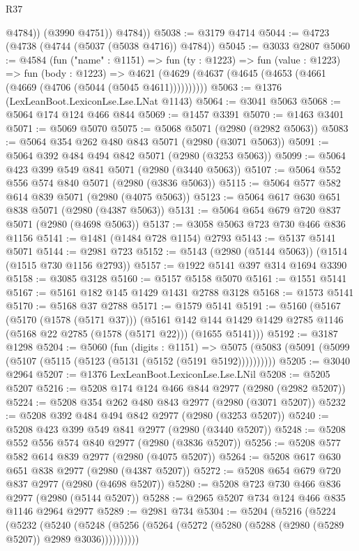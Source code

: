\begin{lexlean}{R37}
\begin{coremodule}
              @4784))
          (@3990 @4751))
        @4784))
@5038 := @3179 @4714
@5044 := @4723 (@4738 (@4744 (@5037 (@5038 @4716)) @4784))
@5045 := @3033 @2807
@5060 := @4584
    (fun ("name" : @1151) =>
    fun (ty : @1223) =>
    fun (value : @1223) =>
    fun (body : @1223) =>
    @4621 (@4629 (@4637 (@4645 (@4653 (@4661 (@4669 (@4706 (@5044 (@5045 @4611))))))))))
@5063 := @1376 (LexLeanBoot.LexiconLse.Lse.LNat @1143)
@5064 := @3041 @5063
@5068 := @5064 @174 @124 @466 @844
@5069 := @1457 @3391
@5070 := @1463 @3401
@5071 := @5069 @5070
@5075 := @5068 @5071 (@2980 (@2982 @5063))
@5083 := @5064 @354 @262 @480 @843 @5071 (@2980 (@3071 @5063))
@5091 := @5064 @392 @484 @494 @842 @5071 (@2980 (@3253 @5063))
@5099 := @5064 @423 @399 @549 @841 @5071 (@2980 (@3440 @5063))
@5107 := @5064 @552 @556 @574 @840 @5071 (@2980 (@3836 @5063))
@5115 := @5064 @577 @582 @614 @839 @5071 (@2980 (@4075 @5063))
@5123 := @5064 @617 @630 @651 @838 @5071 (@2980 (@4387 @5063))
@5131 := @5064 @654 @679 @720 @837 @5071 (@2980 (@4698 @5063))
@5137 := @3058 @5063 @723 @730 @466 @836 @1156
@5141 := @1481 (@1484 @728 @1154) @2793
@5143 := @5137 @5141 @5071
@5144 := @2981 @723
@5152 := @5143 (@2980 (@5144 @5063)) (@1514 (@1515 @730 @1156 @2793))
@5157 := @1922 @5141 @397 @314 @1694 @3390
@5158 := @3085 @3128
@5160 := @5157 @5158 @5070
@5161 := @1551 @5141
@5167 := @5161 @182 @145 @1429 @1431 @2788 @3128
@5168 := @1573 @5141
@5170 := @5168 @37 @2788
@5171 := @1579 @5141
@5191 := @5160
    (@5167
      (@5170 (@1578 (@5171 @37)))
      (@5161 @142 @144 @1429 @1429 @2785 @1146 (@5168 @22 @2785 (@1578 (@5171 @22))) (@1655 @5141)))
@5192 := @3187 @1298
@5204 := @5060
    (fun (digits : @1151) =>
    @5075 (@5083 (@5091 (@5099 (@5107 (@5115 (@5123 (@5131 (@5152 (@5191 @5192))))))))))
@5205 := @3040 @2964
@5207 := @1376 LexLeanBoot.LexiconLse.Lse.LNil
@5208 := @5205 @5207
@5216 := @5208 @174 @124 @466 @844 @2977 (@2980 (@2982 @5207))
@5224 := @5208 @354 @262 @480 @843 @2977 (@2980 (@3071 @5207))
@5232 := @5208 @392 @484 @494 @842 @2977 (@2980 (@3253 @5207))
@5240 := @5208 @423 @399 @549 @841 @2977 (@2980 (@3440 @5207))
@5248 := @5208 @552 @556 @574 @840 @2977 (@2980 (@3836 @5207))
@5256 := @5208 @577 @582 @614 @839 @2977 (@2980 (@4075 @5207))
@5264 := @5208 @617 @630 @651 @838 @2977 (@2980 (@4387 @5207))
@5272 := @5208 @654 @679 @720 @837 @2977 (@2980 (@4698 @5207))
@5280 := @5208 @723 @730 @466 @836 @2977 (@2980 (@5144 @5207))
@5288 := @2965 @5207 @734 @124 @466 @835 @1146 @2964 @2977
@5289 := @2981 @734
@5304 := @5204
    (@5216
      (@5224
        (@5232
          (@5240
            (@5248 (@5256 (@5264 (@5272 (@5280 (@5288 (@2980 (@5289 @5207)) @2989 @3036))))))))))

\end{coremodule}
\end{lexlean}
